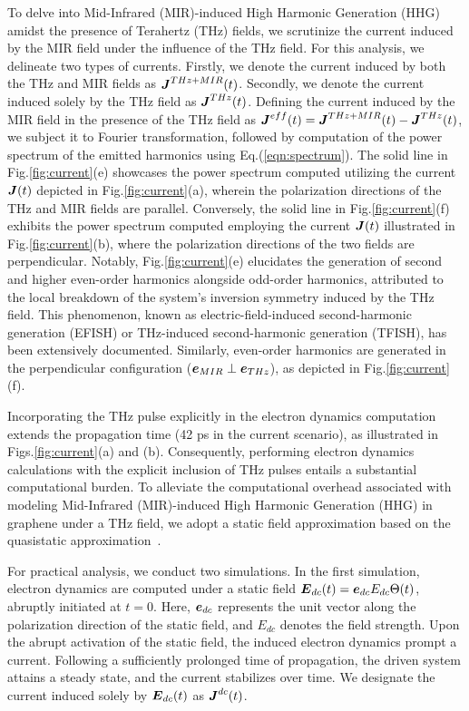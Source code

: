 To delve into Mid-Infrared (MIR)-induced High Harmonic Generation (HHG) amidst the presence of Terahertz (THz) fields, we scrutinize the current induced by the MIR field under the influence of the THz field. For this analysis, we delineate two types of currents. Firstly, we denote the current induced by both the THz and MIR fields as $\boldsymbol J^{THz + MIR}(t)$. Secondly, we denote the current induced solely by the THz field as $\boldsymbol J^{THz}(t)$. Defining the current induced by the MIR field in the presence of the THz field as $\boldsymbol J^{eff}(t) = \boldsymbol J^{THz + MIR}(t) - \boldsymbol J^{THz}(t)$, we subject it to Fourier transformation, followed by computation of the power spectrum of the emitted harmonics using Eq.(\ref{eqn:spectrum}). The solid line in Fig.\ref{fig:current}(e) showcases the power spectrum computed utilizing the current $\boldsymbol J(t)$ depicted in Fig.\ref{fig:current}(a), wherein the polarization directions of the THz and MIR fields are parallel. Conversely, the solid line in Fig.\ref{fig:current}(f) exhibits the power spectrum computed employing the current $\boldsymbol J(t)$ illustrated in Fig.\ref{fig:current}(b), where the polarization directions of the two fields are perpendicular. Notably, Fig.\ref{fig:current}(e) elucidates the generation of second and higher even-order harmonics alongside odd-order harmonics, attributed to the local breakdown of the system's inversion symmetry induced by the THz field. This phenomenon, known as electric-field-induced second-harmonic generation (EFISH) or THz-induced second-harmonic generation (TFISH), has been extensively documented\cite{PhysRevLett.8.404,PhysRev.137.A801,Nahata:98,COOK1999221}. Similarly, even-order harmonics are generated in the perpendicular configuration ($\boldsymbol e_{MIR} \perp \boldsymbol e_{THz}$), as depicted in Fig.\ref{fig:current}(f).

Incorporating the THz pulse explicitly in the electron dynamics computation extends the propagation time (42 ps in the current scenario), as illustrated in Figs.\ref{fig:current}(a) and (b). Consequently, performing electron dynamics calculations with the explicit inclusion of THz pulses entails a substantial computational burden. To alleviate the computational overhead associated with modeling Mid-Infrared (MIR)-induced High Harmonic Generation (HHG) in graphene under a THz field, we adopt a static field approximation based on the quasistatic approximation~\cite{PhysRevB.106.024313}.

For practical analysis, we conduct two simulations. In the first simulation, electron dynamics are computed under a static field $\boldsymbol E_{dc}(t) = \boldsymbol e_{dc} E_{dc}\Theta(t)$, abruptly initiated at $t=0$. Here, $\boldsymbol e_{dc}$ represents the unit vector along the polarization direction of the static field, and $E_{dc}$ denotes the field strength. Upon the abrupt activation of the static field, the induced electron dynamics prompt a current. Following a sufficiently prolonged time of propagation, the driven system attains a steady state, and the current stabilizes over time. We designate the current induced solely by $\boldsymbol E_{dc}(t)$ as $\boldsymbol J^{dc}(t)$.

